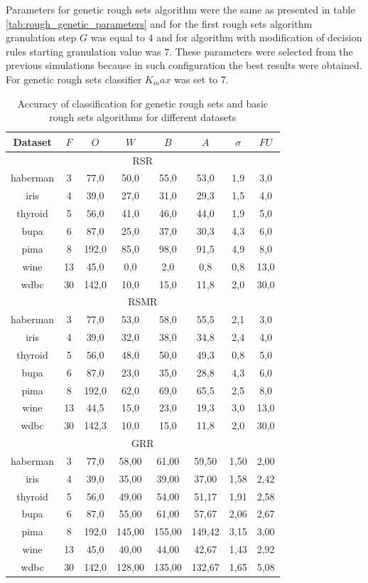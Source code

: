 Parameters for genetic rough sets algorithm were the same as presented in table
\ref{tab:rough_genetic_parameters} and for the first rough sets algorithm
granulation step $G$ was equal to $4$ and for algorithm with modification of
decision rules starting granulation value was $7$. These parameters were
selected from the previous simulations because in such configuration the best
results were obtained. For genetic rough sets classifier $K_max$ was set to 7.
\begin{table}[H]
    \caption{Accuracy of classification for genetic rough sets and basic rough
    sets algorithms for different datasets}
    \centering
    \begin{tabular}{|c|c|c|c|c|c|c|c|}
        \hline
        Dataset&$F$&$O$&$W$&$B$&$A$&$\sigma$&$FU$\\ \hline \hline
        \multicolumn{8}{|c|}{RSR}\\ \hline
        haberman&3&77,0&50,0&55,0&53,0&1,9&3,0\\ \hline
        iris&4&39,0&27,0&31,0&29,3&1,5&4,0\\ \hline
        thyroid&5&56,0&41,0&46,0&44,0&1,9&5,0\\ \hline
        bupa&6&87,0&25,0&37,0&30,3&4,3&6,0\\ \hline
        pima&8&192,0&85,0&98,0&91,5&4,9&8,0\\ \hline
        wine&13&45,0&0,0&2,0&0,8&0,8&13,0\\ \hline
        wdbc&30&142,0&10,0&15,0&11,8&2,0&30,0\\ \hline \hline

        \multicolumn{8}{|c|}{RSMR}\\ \hline
        haberman&3&77,0&53,0&58,0&55,5&2,1&3,0\\ \hline
        iris&4&39,0&32,0&38,0&34,8&2,4&4,0\\ \hline
        thyroid&5&56,0&48,0&50,0&49,3&0,8&5,0\\ \hline
        bupa&6&87,0&23,0&35,0&28,8&4,3&6,0\\ \hline
        pima&8&192,0&62,0&69,0&65,5&2,5&8,0\\ \hline
        wine&13&44,5&15,0&23,0&19,3&3,0&13,0\\ \hline
        wdbc&30&142,3&10,0&15,0&11,8&2,0&30,0\\ \hline \hline

        \multicolumn{8}{|c|}{GRR}\\ \hline
        haberman&3&77,0&58,00&61,00&59,50&1,50&2,00\\ \hline
        iris&4&39,0&35,00&39,00&37,00&1,58&2,42\\ \hline
        thyroid&5&56,0&49,00&54,00&51,17&1,91&2,58\\ \hline
        bupa&6&87,0&55,00&61,00&57,67&2,06&2,67\\ \hline
        pima&8&192,0&145,00&155,00&149,42&3,15&3,00\\ \hline
        wine&13&45,0&40,00&44,00&42,67&1,43&2,92\\ \hline
        wdbc&30&142,0&128,00&135,00&132,67&1,65&5,08\\ \hline
    \end{tabular}
    \label{tab:genetic_rough_results}
\end{table}
